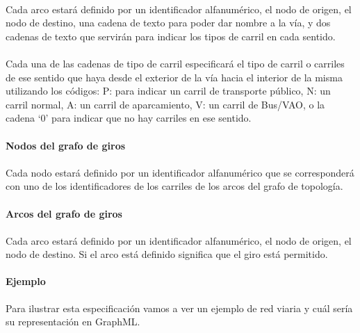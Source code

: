 	\paragraph{}
	Cada arco estará definido por un identificador alfanumérico, el nodo de origen, el nodo de destino, una cadena de texto para poder dar nombre a la vía, y dos cadenas de texto que servirán para indicar los tipos de carril en cada sentido.
	
	\paragraph{}
	Cada una de las cadenas de tipo de carril especificará el tipo de carril o carriles de ese sentido que haya desde el exterior de la vía hacia el interior de la misma utilizando los códigos: P: para indicar un carril de transporte público, N: un carril normal, A: un carril de aparcamiento, V: un carril de Bus/VAO, o la cadena `0' para indicar que no hay carriles en ese sentido.
	
	\paragraph{Nodos del grafo de giros}
	
	\paragraph{}
	Cada nodo estará definido por un identificador alfanumérico que se corresponderá con uno de los identificadores de los carriles de los arcos del grafo de topología.
	
	\paragraph{Arcos del grafo de giros}
	
	\paragraph{}
	Cada arco estará definido por un identificador alfanumérico, el nodo de origen, el nodo de destino. Si el arco está definido significa que el giro está permitido.
	
	\paragraph{Ejemplo}
	Para ilustrar esta especificación vamos a ver un ejemplo de red viaria y cuál sería su representación en GraphML.
	
